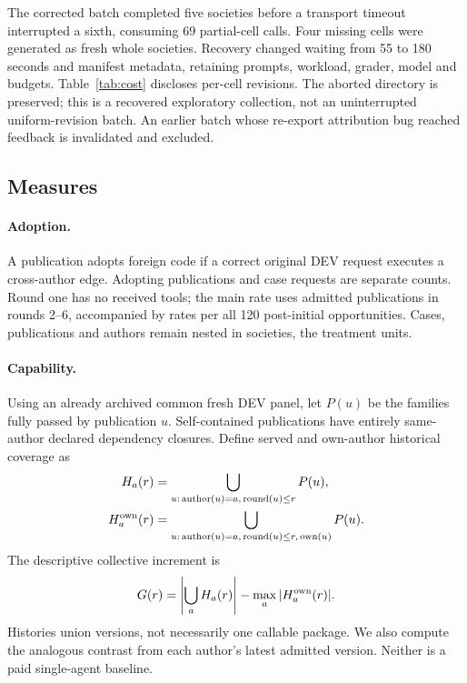 \documentclass[sigconf,anonymous]{aamas}
\begin{document}
The corrected batch completed five societies before a transport timeout interrupted a sixth, consuming 69 partial-cell calls. Four missing cells were generated as fresh whole societies. Recovery changed waiting from 55 to 180 seconds and manifest metadata, retaining prompts, workload, grader, model and budgets. Table~\ref{tab:cost} discloses per-cell revisions. The aborted directory is preserved; this is a recovered exploratory collection, not an uninterrupted uniform-revision batch. An earlier batch whose re-export attribution bug reached feedback is invalidated and excluded.

\begin{table}[t]
\centering\small\setlength{\tabcolsep}{4pt}
\caption{Every valid society's usage and generation source. Cached input is a subset of input. Wait is client timeout, not run duration. The failed partial society adds 69 calls, retained separately in total accounting; no currency conversion is claimed. Recovery cells remain distinct from the aborted batch.}
\label{tab:cost}
\end{table}

\subsection{Measures}
\paragraph{Adoption.} A publication adopts foreign code if a correct original DEV request executes a cross-author edge. Adopting publications and case requests are separate counts. Round one has no received tools; the main rate uses admitted publications in rounds 2--6, accompanied by rates per all 120 post-initial opportunities. Cases, publications and authors remain nested in societies, the treatment units.

\paragraph{Capability.} Using an already archived common fresh DEV panel, let $P(u)$ be the families fully passed by publication $u$. Self-contained publications have entirely same-author declared dependency closures. Define served and own-author historical coverage as
\begin{align}
H_a(r)&=\bigcup_{u:\,\mathrm{author}(u)=a,\,\mathrm{round}(u)\le r}P(u),\\
H_a^{\rm own}(r)&=\bigcup_{u:\,\mathrm{author}(u)=a,\,\mathrm{round}(u)\le r,\,\mathrm{own}(u)}P(u).
\end{align}
The descriptive collective increment is
\begin{equation}\label{eq:gap}
G(r)=\left|\bigcup_a H_a(r)\right|-\max_a|H_a^{\rm own}(r)|.
\end{equation}
Histories union versions, not necessarily one callable package. We also compute the analogous contrast from each author's latest admitted version. Neither is a paid single-agent baseline.
\end{document}
